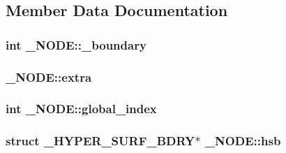 \subsection{Member Data Documentation}
\subsubsection[{\texorpdfstring{\+\_\+boundary}{_boundary}}]{\setlength{\rightskip}{0pt plus 5cm}int \+\_\+\+N\+O\+D\+E\+::\+\_\+boundary}\hypertarget{struct___n_o_d_e_a6d002773d5893f921fe7f8247fb103f4}{}\label{struct___n_o_d_e_a6d002773d5893f921fe7f8247fb103f4}
\subsubsection[{\texorpdfstring{extra}{extra}}]{ \+\_\+\+N\+O\+D\+E\+::extra}\hypertarget{struct___n_o_d_e_a2670bc532dcf95a67bd22f2d35a9446d}{}\label{struct___n_o_d_e_a2670bc532dcf95a67bd22f2d35a9446d}
\subsubsection[{\texorpdfstring{global\+\_\+index}{global_index}}]{\setlength{\rightskip}{0pt plus 5cm}int \+\_\+\+N\+O\+D\+E\+::global\+\_\+index}\hypertarget{struct___n_o_d_e_a261f43bc74ccafa8cb3e8a13569321ac}{}\label{struct___n_o_d_e_a261f43bc74ccafa8cb3e8a13569321ac}
\subsubsection[{\texorpdfstring{hsb}{hsb}}]{\setlength{\rightskip}{0pt plus 5cm}struct {\bf \+\_\+\+H\+Y\+P\+E\+R\+\_\+\+S\+U\+R\+F\+\_\+\+B\+D\+RY}$\ast$ \+\_\+\+N\+O\+D\+E\+::hsb}\hypertarget{struct___n_o_d_e_acfddd1c129d819893a6ff0511cbd3447}{}\label{struct___n_o_d_e_acfddd1c129d819893a6ff0511cbd3447}
